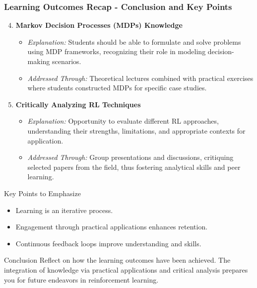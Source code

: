 \documentclass[aspectratio=169]{beamer}
\begin{document}
\begin{frame}[fragile]
    \frametitle{Learning Outcomes Recap - Conclusion and Key Points}
    \begin{enumerate}
        \setcounter{enumi}{3}
        \item \textbf{Markov Decision Processes (MDPs) Knowledge}
            \begin{itemize}
                \item \textit{Explanation:} Students should be able to formulate and solve problems using MDP frameworks, recognizing their role in modeling decision-making scenarios.
                \item \textit{Addressed Through:} Theoretical lectures combined with practical exercises where students constructed MDPs for specific case studies.
            \end{itemize}
        
        \item \textbf{Critically Analyzing RL Techniques}
            \begin{itemize}
                \item \textit{Explanation:} Opportunity to evaluate different RL approaches, understanding their strengths, limitations, and appropriate contexts for application.
                \item \textit{Addressed Through:} Group presentations and discussions, critiquing selected papers from the field, thus fostering analytical skills and peer learning.
            \end{itemize}
    \end{enumerate}
    
    \begin{block}{Key Points to Emphasize}
        \begin{itemize}
            \item Learning is an iterative process.
            \item Engagement through practical applications enhances retention.
            \item Continuous feedback loops improve understanding and skills.
        \end{itemize}
    \end{block}

    \begin{block}{Conclusion}
        Reflect on how the learning outcomes have been achieved. The integration of knowledge via practical applications and critical analysis prepares you for future endeavors in reinforcement learning.
    \end{block}
\end{frame}
\end{document}
